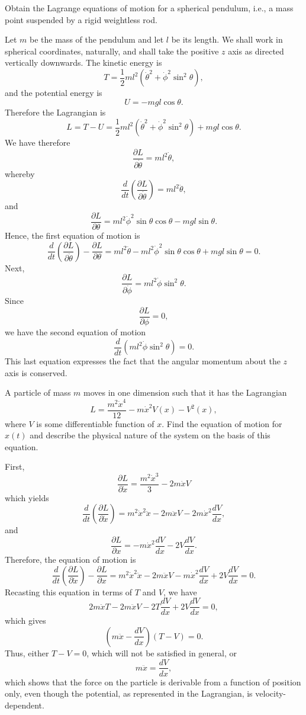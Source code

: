 \begin{questions}
\question
Obtain the Lagrange equations of motion for a spherical pendulum, i.e., a mass point suspended by a rigid weightless rod.
\begin{solution}
Let $m$ be the mass of the pendulum and let $l$ be its length. We shall work in spherical coordinates, naturally, and shall take the positive $z$ axis as directed vertically downwards. The kinetic energy is
\[
T = \frac{1}{2} m l^2 ( \dot{\theta}^2 + \dot{\phi}^2 \sin^2 \theta ),
\]
and the potential energy is
\[
U = - m g l \cos \theta.
\]
Therefore the Lagrangian is
\[
L = T - U = \frac{1}{2} m l^2 ( \dot{\theta}^2 + \dot{\phi}^2 \sin^2 \theta ) + m g l \cos \theta.
\]
We have therefore
\[
\frac{\partial L}{\partial \dot{\theta}} = m l^2 \dot{\theta},
\]
whereby
\[
\frac{d}{dt} \left( \frac{\partial L}{\partial \dot{\theta}} \right) = m l^2 \ddot{\theta},
\]
and
\[
\frac{\partial L}{\partial \theta} = m l^2 \dot{\phi}^2 \sin \theta \cos \theta - m g l \sin \theta.
\]
Hence, the first equation of motion is
\[
\frac{d}{dt} \left( \frac{\partial L}{\partial \dot{\theta}} \right) - \frac{\partial L}{\partial \theta} = m l^2 \ddot{\theta} - m l^2 \dot{\phi}^2 \sin \theta \cos \theta + m g l \sin \theta = 0.
\]
Next,
\[
\frac{\partial L}{\partial \dot{\phi}} = m l^2 \dot{\phi} \sin^2 \theta.
\]
Since
\[
\frac{\partial L}{\partial \phi} = 0,
\]
we have the second equation of motion
\[
\frac{d}{dt} \left( m l^2 \dot{\phi} \sin^2 \theta \right) = 0.
\]
This last equation expresses the fact that the angular momentum about the $z$ axis is conserved.
\end{solution}

\question
A particle of mass $m$ moves in one dimension such that it has the Lagrangian
\[
L = \frac{m^2 \dot{x}^4}{12} - m \dot{x}^2 V(x) - V^2(x),
\]
where $V$ is some differentiable function of $x$. Find the equation of motion for $x(t)$ and describe the physical nature of the system on the basis of this equation.
\begin{solution}
First,
\[
\frac{\partial L}{\partial \dot{x}} = \frac{m^2 \dot{x}^3}{3} - 2 m \dot{x} V
\]
which yields
\[
\frac{d}{dt} \left( \frac{\partial L}{\partial \dot{x}} \right) = m^2 \dot{x}^2 \ddot{x} - 2 m \ddot{x} V - 2 m \dot{x}^2 \frac{dV}{dx},
\]
and
\[
\frac{\partial L}{\partial x} = -m \dot{x}^2 \frac{dV}{dx} - 2 V \frac{dV}{dx}.
\]
Therefore, the equation of motion is
\[
\frac{d}{dt} \left( \frac{\partial L}{\partial \dot{x}} \right) - \frac{\partial L}{\partial x} = m^2 \dot{x}^2 \ddot{x} - 2 m \ddot{x} V - m \dot{x}^2 \frac{dV}{dx} + 2 V \frac{dV}{dx} = 0.
\]
Recasting this equation in terms of $T$ and $V$, we have
\[
2 m \ddot{x} T - 2 m \ddot{x} V - 2 T \frac{dV}{dx} + 2 V \frac{dV}{dx} = 0,
\]
which gives
\[
\left( m \ddot{x} - \frac{dV}{dx} \right) \left( T - V \right) = 0.
\]
Thus, either $T - V = 0$, which will not be satisfied in general, or
\[
m \ddot{x} = \frac{dV}{dx},
\]
which shows that the force on the particle is derivable from a function of position only, even though the potential, as represented in the Lagrangian, is velocity- dependent.
\end{solution}


\end{questions}
